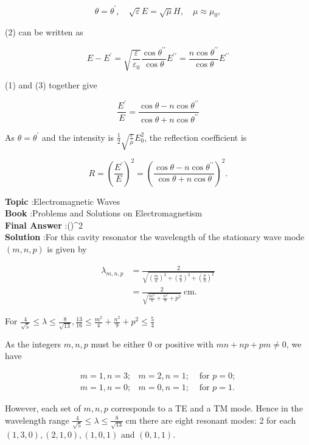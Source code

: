 \documentclass[10pt]{article}
\begin{document}
$$
\theta=\theta^{\prime}, \quad \sqrt{\varepsilon} E=\sqrt{\mu} H, \quad \mu \approx \mu_{0},
$$

(2) can be written as

$$
E-E^{\prime}=\sqrt{\frac{\varepsilon}{\varepsilon_{0}}} \frac{\cos \theta^{\prime \prime}}{\cos \theta} E^{\prime \prime}=\frac{n \cos \theta^{\prime \prime}}{\cos \theta} E^{\prime \prime}
$$

(1) and (3) together give

$$
\frac{E^{\prime}}{E}=\frac{\cos \theta-n \cos \theta^{\prime \prime}}{\cos \theta+n \cos \theta^{\prime \prime}}
$$

As $\theta=\theta^{\prime}$ and the intensity is $\frac{1}{2} \sqrt{\frac{\varepsilon}{\mu}} E_{0}^{2}$, the reflection coefficient is

$$
R=\left(\frac{E^{\prime}}{E}\right)^{2}=\left(\frac{\cos \theta-n \cos \theta^{\prime \prime}}{\cos \theta+n \cos \theta}\right)^{2} .
$$



\textbf{Topic} :Electromagnetic Waves\\
\textbf{Book} :Problems and Solutions on Electromagnetism\\
\textbf{Final Answer} :\left(\right)^{2}\\


\textbf{Solution} :For this cavity resonator the wavelength of the stationary wave mode $(m, n, p)$ is given by

$$
\begin{aligned}
\lambda_{m, n, p} &=\frac{2}{\sqrt{\left(\frac{m}{a}\right)^{2}+\left(\frac{n}{b}\right)^{2}+\left(\frac{p}{h}\right)^{2}}} \\
&=\frac{2}{\sqrt{\frac{m^{2}}{4}+\frac{n^{2}}{9}+p^{2}}} \mathrm{~cm} .
\end{aligned}
$$

For $\frac{4}{\sqrt{5}} \leq \lambda \leq \frac{8}{\sqrt{13}}, \frac{13}{16} \leq \frac{m^{2}}{4}+\frac{n^{2}}{9}+p^{2} \leq \frac{5}{4}$

As the integers $m, n, p$ must be either 0 or positive with $m n+n p+p m \neq 0$, we have

$$
\begin{array}{lll}
m=1, n=3 ; & m=2, n=1 ; & \text { for } p=0 ; \\
m=1, n=0 ; & m=0, n=1 ; & \text { for } p=1 .
\end{array}
$$

However, each set of $m, n, p$ corresponds to a TE and a TM mode. Hence in the wavelength range $\frac{4}{\sqrt{5}} \leq \lambda \leq \frac{8}{\sqrt{13}} \mathrm{~cm}$ there are eight resonant modes: 2 for each $(1,3,0),(2,1,0),(1,0,1)$ and $(0,1,1)$.
\end{document}
